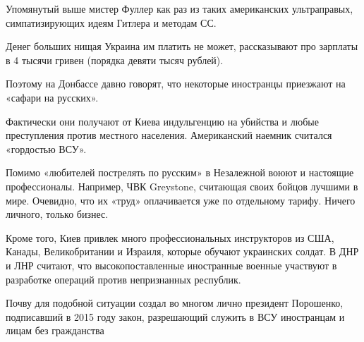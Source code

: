 Упомянутый выше мистер Фуллер как раз из таких американских ультраправых,
симпатизирующих идеям Гитлера и методам СС.

Денег больших нищая Украина им платить не может, рассказывают про зарплаты в 4
тысячи гривен (порядка девяти тысяч рублей).

Поэтому на Донбассе давно говорят, что некоторые иностранцы приезжают на
«сафари на русских».

Фактически они получают от Киева индульгенцию на убийства и любые преступления
против местного населения. Американский наемник считался «гордостью ВСУ».

Помимо «любителей пострелять по русским» в Незалежной воюют и настоящие
профессионалы. Например, ЧВК Greystone, считающая своих бойцов лучшими в мире.
Очевидно, что их «труд» оплачивается уже по отдельному тарифу.  Ничего личного,
только бизнес.

Кроме того, Киев привлек много профессиональных инструкторов из США, Канады,
Великобритании и Израиля, которые обучают украинских солдат. В ДНР и ЛНР
считают, что высокопоставленные иностранные военные участвуют в разработке
операций против непризнанных республик.

Почву для подобной ситуации создал во многом лично президент Порошенко,
подписавший в 2015 году закон, разрешающий служить в ВСУ иностранцам и лицам
без гражданства
  
